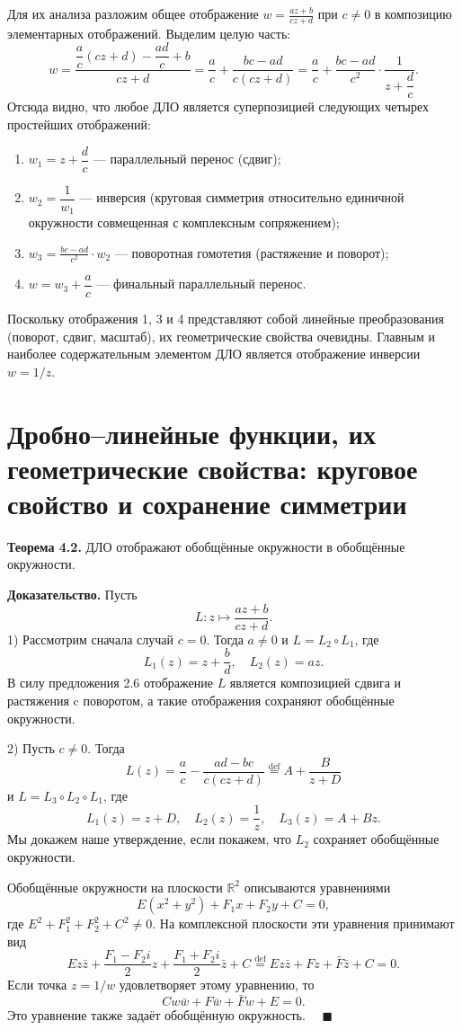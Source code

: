 \documentclass[12pt, a4paper]{article}
\theoremstyle{definition}
\theoremstyle{remark}
\begin{document}
Для их анализа разложим общее отображение $w = \frac{az + b}{cz + d}$ при $c \neq 0$ в композицию элементарных отображений. Выделим целую часть:
\[
w = \frac{\dfrac{a}{c}(cz + d) - \dfrac{ad}{c} + b}{cz + d} = \frac{a}{c} + \frac{bc - ad}{c(cz + d)} = \frac{a}{c} + \frac{bc - ad}{c^2} \cdot \frac{1}{z + \dfrac{d}{c}}.
\]
Отсюда видно, что любое ДЛО является суперпозицией следующих четырех простейших отображений:
\begin{enumerate}
	\item $w_1 = z + \dfrac{d}{c}$ --- параллельный перенос (сдвиг);
	\item $w_2 = \dfrac{1}{w_1}$ --- инверсия (круговая симметрия относительно единичной окружности совмещенная с комплексным сопряжением);
	\item $w_3 = \frac{bc - ad}{c^2} \cdot w_2$ --- поворотная гомотетия (растяжение и поворот);
	\item $w = w_3 + \dfrac{a}{c}$ --- финальный параллельный перенос.
\end{enumerate}
Поскольку отображения 1, 3 и 4 представляют собой линейные преобразования (поворот, сдвиг, масштаб), их геометрические свойства очевидны. Главным и наиболее содержательным элементом ДЛО является отображение инверсии $w = 1/z$.

\newpage
\section{Дробно–линейные функции, их геометрические свойства: круговое свойство и сохранение симметрии}
\textbf{Теорема 4.2.} ДЛО отображают обобщённые окружности в обобщённые окружности.

\textbf{Доказательство.} Пусть
\[
L : z \mapsto \frac{az + b}{cz + d}.
\]
1) Рассмотрим сначала случай $c = 0$. Тогда $a \neq 0$ и $L = L_2 \circ L_1$, где
\[
L_1(z) = z + \frac{b}{d}, \quad L_2(z) = az.
\]
В силу предложения 2.6 отображение $L$ является композицией сдвига и растяжения c поворотом, а такие отображения сохраняют обобщённые окружности.

2) Пусть $c \neq 0$. Тогда
\[
L(z) = \frac{a}{c} - \frac{ad - bc}{c(cz + d)} \stackrel{\text{def}}{=} A + \frac{B}{z + D}
\]
и $L = L_3 \circ L_2 \circ L_1$, где
\[
L_1(z) = z + D, \quad L_2(z) = \frac{1}{z}, \quad L_3(z) = A + Bz.
\]
Мы докажем наше утверждение, если покажем, что $L_2$ сохраняет обобщённые окружности.

Обобщённые окружности на плоскости $\mathbb{R}^2$ описываются уравнениями
\[
E(x^2 + y^2) + F_1x + F_2y + C = 0,
\]
где $E^2 + F_1^2 + F_2^2 + C^2 \neq 0$. На комплексной плоскости эти уравнения принимают вид
\[
E z\bar{z} + \frac{F_1 - F_2i}{2}z + \frac{F_1 + F_2i}{2}\bar{z} + C \stackrel{\text{def}}{=} E z\bar{z} + Fz + \bar{F}\bar{z} + C = 0.
\]
Если точка $z = 1/w$ удовлетворяет этому уравнению, то
\[
C w\bar{w} + F\bar{w} + \bar{F}w + E = 0.
\]
Это уравнение также задаёт обобщённую окружность. $\quad \blacksquare$
\end{document}
